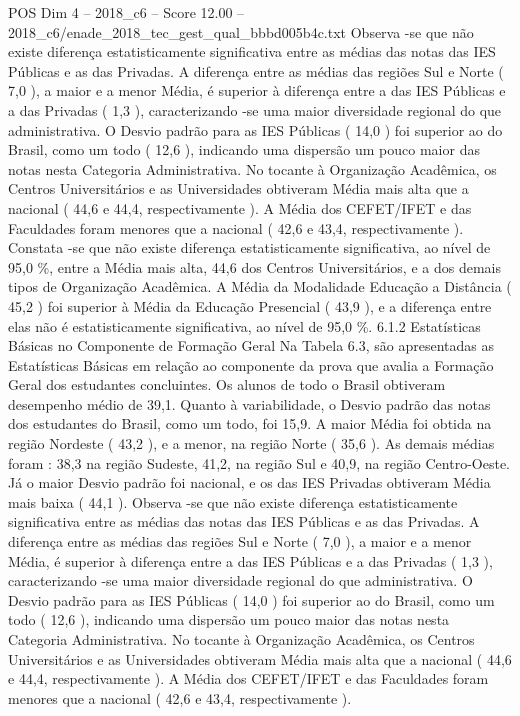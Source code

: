 \begin{textsample}{POS Dim 4 – 2018\_c6 – Score 12.00 – 2018\_c6/enade\_2018\_tec\_gest\_qual\_bbbd005b4c.txt}
Observa -se que não existe diferença estatisticamente significativa entre as médias das notas das IES Públicas e as das Privadas.
A diferença entre as médias das regiões Sul e Norte ( 7,0 ), a maior e a menor Média, é superior à diferença entre a das IES Públicas e a das Privadas ( 1,3 ), caracterizando -se uma maior diversidade regional do que administrativa.
O Desvio padrão para as IES Públicas ( 14,0 ) foi superior ao do Brasil, como um todo ( 12,6 ), indicando uma dispersão um pouco maior das notas nesta Categoria Administrativa.
No tocante à Organização Acadêmica, os Centros Universitários e as Universidades obtiveram Média mais alta que a nacional ( 44,6 e 44,4, respectivamente ).
A Média dos CEFET/IFET e das Faculdades foram menores que a nacional ( 42,6 e 43,4, respectivamente ).
Constata -se que não existe diferença estatisticamente significativa, ao nível de 95,0 \%, entre a Média mais alta, 44,6 dos Centros Universitários, e a dos demais tipos de Organização Acadêmica.
A Média da Modalidade Educação a Distância ( 45,2 ) foi superior à Média da Educação Presencial ( 43,9 ), e a diferença entre elas não é estatisticamente significativa, ao nível de 95,0 \%. 6.1.2 Estatísticas Básicas no Componente de Formação Geral Na Tabela 6.3, são apresentadas as Estatísticas Básicas em relação ao componente da prova que avalia a Formação Geral dos estudantes concluintes.
Os alunos de todo o Brasil obtiveram desempenho médio de 39,1.
Quanto à variabilidade, o Desvio padrão das notas dos estudantes do Brasil, como um todo, foi 15,9.
A maior Média foi obtida na região Nordeste ( 43,2 ), e a menor, na região Norte ( 35,6 ).
As demais médias foram : 38,3 na região Sudeste, 41,2, na região Sul e 40,9, na região Centro-Oeste.
Já o maior Desvio padrão foi nacional, e os das IES Privadas obtiveram Média mais baixa ( 44,1 ).
Observa -se que não existe diferença estatisticamente significativa entre as médias das notas das IES Públicas e as das Privadas.
A diferença entre as médias das regiões Sul e Norte ( 7,0 ), a maior e a menor Média, é superior à diferença entre a das IES Públicas e a das Privadas ( 1,3 ), caracterizando -se uma maior diversidade regional do que administrativa.
O Desvio padrão para as IES Públicas ( 14,0 ) foi superior ao do Brasil, como um todo ( 12,6 ), indicando uma dispersão um pouco maior das notas nesta Categoria Administrativa.
No tocante à Organização Acadêmica, os Centros Universitários e as Universidades obtiveram Média mais alta que a nacional ( 44,6 e 44,4, respectivamente ).
A Média dos CEFET/IFET e das Faculdades foram menores que a nacional ( 42,6 e 43,4, respectivamente ).

\end{textsample}
